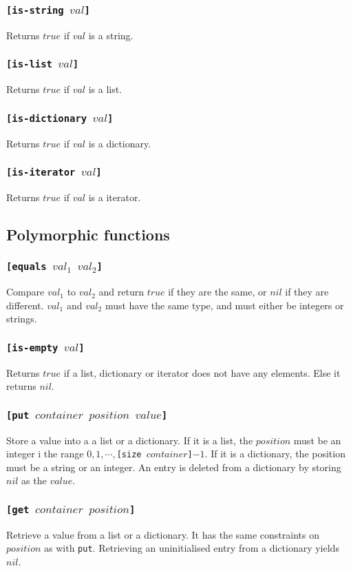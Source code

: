 \subsubsection{\tt{[is-string }$val$\tt{]}}
Returns $true$ if $val$ is a string.
\subsubsection{\tt{[is-list }$val$\tt{]}}
Returns $true$ if $val$ is a list.
\subsubsection{\tt{[is-dictionary }$val$\tt{]}}
Returns $true$ if $val$ is a dictionary.
\subsubsection{\tt{[is-iterator }$val$\tt{]}}
Returns $true$ if $val$ is a iterator.

\subsection{Polymorphic functions}
\subsubsection{\tt{[equals }$val_1$ $val_2$\tt{]}}
Compare $val_1$ to $val_2$ and return $true$ if they are the same, or $nil$ if they are different. $val_1$ and $val_2$ must have the same type, and must either be integers or strings.
\subsubsection{\tt{[is-empty }$val$\tt{]}}
Returns $true$ if a list, dictionary or iterator does not have any elements. Else it returns $nil$.
\subsubsection{\tt{[put }$container$ $position$ $value$\tt{]}}
Store a value into a a list or a dictionary. If it is a list, the $position$ must be an integer i the range $0,1, \cdots, ${\tt{[size }}$container${\tt{]}}$-1$.
If it is a dictionary, the position must be a string or an integer. An entry is deleted from a dictionary by storing $nil$ as the $value$.
\subsubsection{\tt{[get }$container$ $position$\tt{]}}
Retrieve a value from a list or a dictionary. It has the same constraints on $position$ as with \verb|put|. Retrieving an uninitialised entry from a dictionary yields $nil$.
